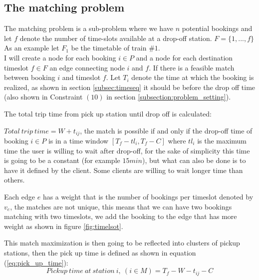 \documentclass{article}
\begin{document}


\subsection{The matching problem}
\label{subsec:matching-prob}

The matching problem is a sub-problem where we have $n$ potential bookings and let $f$ denote the number of time-slots available at a drop-off station. $F = \{ 1, ..., f \}$ As an example let $F_1$ be the timetable of train $\#1$.\\
I will create a node for each booking $i \in P$ and a node for each destination timeslot $f \in F$ an edge connecting node $i$ and $f$. If there is a feasible match between booking $i$ and timeslot $f$. 
Let $T_i$ denote the time at which the booking is realized, as shown in section \ref{subsec:timeseq} it should be before the drop off time (also shown in Constraint $(10)$ in section \ref{subsection:problem_setting}).

The total trip time from pick up station until drop off is calculated:
 
\noindent$Total\ trip\ time = W + t_{ij} $, the match is possible if and only if the drop-off time of booking $i \in P$ is in a time window $[T_f - tl_i,T_f - C ]$ where
$tl_i$ is the maximum time the user is willing to wait after drop-off, for the sake of simplicity this time is going to be a constant (for example $15min$), but what can also be done is to have it defined by the client. Some clients are willing to
wait longer time than others.

Each edge $e$ has a weight that is the number of bookings per timeslot denoted by $v_e$, the matches are not unique, this means that we can have two bookings matching with two timeslots, we add the booking to the edge that has more weight as shown in figure \ref{fig:timelsot}.


This match maximization is then going to be reflected into clusters of pickup stations, then the pick up time is defined as shown in equation (\ref{eq:pick_up_time}):
\begin{equation}
\label{eq:pick_up_time}
Pickup \ time \ at \ station\ i, \ (i \in M) = T_f - W - t_{ij} - C
\end{equation}
\end{document}
